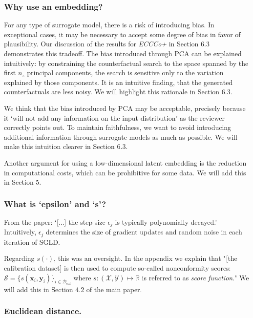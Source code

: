 \documentclass[letterpaper]{article} %
\begin{document}
\subsubsection{Why use an embedding?}

For any type of surrogate model, there is a risk of introducing bias. In exceptional cases, it may be necessary to accept some degree of bias in favor of plausibility. Our discussion of the results for \textit{ECCCo+} in Section 6.3 demonstrates this tradeoff. The bias introduced through PCA can be explained intuitively: by constraining the counterfactual search to the space spanned by the first $n_z$ principal components, the search is sensitive only to the variation explained by those components. It is an intuitive finding, that the generated counterfactuals are less noisy. We will highlight this rationale in Section 6.3.

We think that the bias introduced by PCA may be acceptable, precisely because it `will not add any information on the input distribution' as the reviewer correctly points out. To maintain faithfulness, we want to avoid introducing additional information through surrogate models as much as possible. We will make this intuition clearer in Section 6.3.

Another argument for using a low-dimensional latent embedding is the reduction in computational costs, which can be prohibitive for some data. We will add this in Section 5. 

\subsubsection{What is `epsilon' and `s'?}

From the paper: `[...] the step-size $\epsilon_j$ is typically polynomially decayed.' Intuitively, $\epsilon_j$ determines the size of gradient updates and random noise in each iteration of SGLD.

Regarding $s(\cdot)$, this was an oversight. In the appendix we explain that "[the calibration dataset] is then used to compute so-called nonconformity scores: $\mathcal{S}=\{s(\mathbf{x}_i,\mathbf{y}_i)\}_{i \in \mathcal{D}_{\text{cal}}}$ where $s: (\mathcal{X},\mathcal{Y}) \mapsto \mathbb{R}$ is referred to as \textit{score function}." We will add this in Section 4.2 of the main paper. 

\subsubsection{Euclidean distance.}
\end{document}
